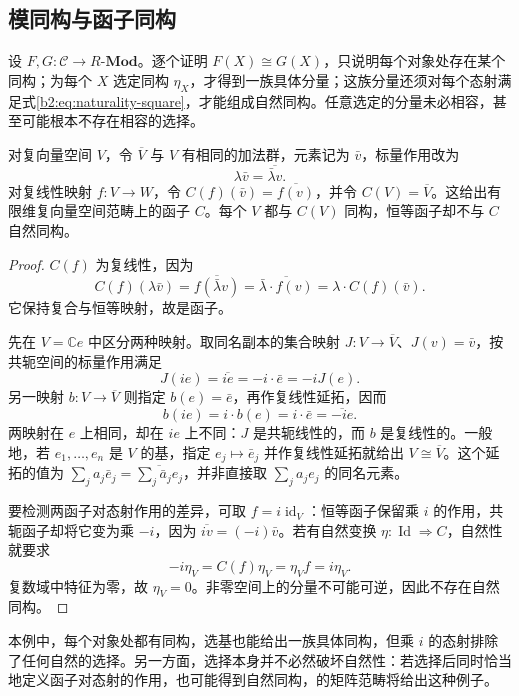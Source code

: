 \subsection{模同构与函子同构}
\label{b2:subsec:0502:03}

设 \(F,G:\mathcal C\rightarrow R\text{-}\mathbf{Mod}\)。逐个证明 \(F(X)\cong G(X)\)，只说明每个对象处存在某个同构；为每个 \(X\) 选定同构 \(\eta_X\)，才得到一族具体分量；这族分量还须对每个态射满足式\eqref{b2:eq:naturality-square}，才能组成自然同构。任意选定的分量未必相容，甚至可能根本不存在相容的选择。

\begin{example}[逐对象同构而非自然同构]\label{b2:ex:conjugation-not-natural}
	对复向量空间 \(V\)，令 \(\overline V\) 与 \(V\) 有相同的加法群，元素记为 \(\bar v\)，标量作用改为
	\[
		\lambda\bar v=\overline{\bar\lambda v}.
	\]
	对复线性映射 \(f:V\rightarrow W\)，令 \(C(f)(\bar v)=\overline{f(v)}\)，并令 \(C(V)=\overline V\)。这给出有限维复向量空间范畴上的函子 \(C\)。每个 \(V\) 都与 \(C(V)\) 同构，恒等函子却不与 \(C\) 自然同构。
\end{example}
\begin{proof}
	\(C(f)\) 为复线性，因为
	\[
		C(f)(\lambda\bar v)=\overline{f(\bar\lambda v)} =\overline{\bar\lambda\cdot f(v)}=\lambda\cdot C(f)(\bar v).
	\]
	它保持复合与恒等映射，故是函子。

	先在 \(V=\mathbb Ce\) 中区分两种映射。取同名副本的集合映射 \(J:V\to\overline V\)、\(J(v)=\bar v\)，按共轭空间的标量作用满足
	\[
		J(ie)=\overline{ie}=-i\cdot\bar e=-iJ(e).
	\]
	另一映射 \(b:V\to\overline V\) 则指定 \(b(e)=\bar e\)，再作复线性延拓，因而
	\[
		b(ie)=i\cdot b(e)=i\cdot\bar e=\overline{-ie}.
	\]
	两映射在 \(e\) 上相同，却在 \(ie\) 上不同：\(J\) 是共轭线性的，而 \(b\) 是复线性的。一般地，若 \(e_1,\ldots,e_n\) 是 \(V\) 的基，指定 \(e_j\mapsto\bar e_j\) 并作复线性延拓就给出 \(V\cong\overline V\)。这个延拓的值为 \(\sum_j a_j\bar e_j=\overline{\sum_j\bar a_je_j}\)，并非直接取 \(\sum_j a_je_j\) 的同名元素。

	要检测两函子对态射作用的差异，可取 \(f=i\operatorname{id}_V\)：恒等函子保留乘 \(i\) 的作用，共轭函子却将它变为乘 \(-i\)，因为 \(\overline{iv}=(-i)\bar v\)。若有自然变换 \(\eta:\operatorname{Id}\Rightarrow C\)，自然性就要求
	\[
		-i\eta_V=C(f)\eta_V=\eta_Vf=i\eta_V.
	\]
	复数域中特征为零，故 \(\eta_V=0\)。非零空间上的分量不可能可逆，因此不存在自然同构。
\end{proof}

本例中，每个对象处都有同构，选基也能给出一族具体同构，但乘 \(i\) 的态射排除了任何自然的选择。另一方面，选择本身并不必然破坏自然性：若选择后同时恰当地定义函子对态射的作用，也可能得到自然同构，的矩阵范畴将给出这种例子。

